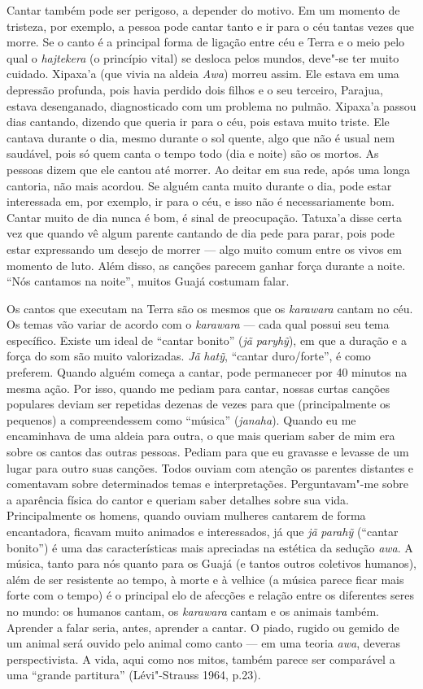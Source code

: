 Cantar também pode ser perigoso, a depender do motivo. Em um momento de
tristeza, por exemplo, a pessoa pode cantar tanto e ir para o céu tantas
vezes que morre. Se o canto é a principal forma de ligação entre céu e
Terra e o meio pelo qual o \emph{hajtekera} (o princípio vital) se
desloca pelos mundos, deve"-se ter muito cuidado. Xipaxa'a (que vivia na
aldeia \emph{Awa}) morreu assim. Ele estava em uma depressão profunda,
pois havia perdido dois filhos e o seu terceiro, Parajua, estava
desenganado, diagnosticado com um problema no pulmão. Xipaxa'a passou
dias cantando, dizendo que queria ir para o céu, pois estava muito
triste. Ele cantava durante o dia, mesmo durante o sol quente, algo que
não é usual nem saudável, pois só quem canta o tempo todo (dia e noite)
são os mortos. As pessoas dizem que ele cantou até morrer. Ao deitar em
sua rede, após uma longa cantoria, não mais acordou. Se alguém canta
muito durante o dia, pode estar interessada em, por exemplo, ir para o
céu, e isso não é necessariamente bom. Cantar muito de dia nunca é bom,
é sinal de preocupação. Tatuxa'a disse certa vez que quando vê algum
parente cantando de dia pede para parar, pois pode estar expressando um
desejo de morrer --- algo muito comum entre os vivos em momento de luto.
Além disso, as canções parecem ganhar força durante a noite. ``Nós
cantamos na noite'', muitos Guajá costumam falar.

Os cantos que executam na Terra são os mesmos que os \emph{karawara}
cantam no céu. Os temas vão variar de acordo com o \emph{karawara} ---
cada qual possui seu tema específico. Existe um ideal de ``cantar bonito''
(\emph{jã} \emph{paryhỹ}), em que a duração e a força do som são muito
valorizadas. \emph{Jã} \emph{hatỹ}, ``cantar duro/forte'', é como
preferem. Quando alguém começa a cantar, pode permanecer por 40 minutos
na mesma ação. Por isso, quando me pediam para cantar, nossas curtas
canções populares deviam ser repetidas dezenas de vezes para que
(principalmente os pequenos) a compreendessem como ``música''
(\emph{janaha}). Quando eu me encaminhava de uma aldeia para outra, o
que mais queriam saber de mim era sobre os cantos das outras pessoas.
Pediam para que eu gravasse e levasse de um lugar para outro suas
canções. Todos ouviam com atenção os parentes distantes e comentavam
sobre determinados temas e interpretações. Perguntavam"-me sobre a
aparência física do cantor e queriam saber detalhes sobre sua vida.
Principalmente os homens, quando ouviam mulheres cantarem de forma
encantadora, ficavam muito animados e interessados, já que \emph{jã}
\emph{parahỹ} (``cantar bonito'') é uma das características mais
apreciadas na estética da sedução \emph{awa}. A música, tanto para nós
quanto para os Guajá (e tantos outros coletivos humanos), além de ser
resistente ao tempo, à morte e à velhice (a música parece ficar mais
forte com o tempo) é o principal elo de afecções e relação entre os
diferentes seres no mundo: os humanos cantam, os \emph{karawara} cantam
e os animais também. Aprender a falar seria, antes, aprender a cantar. O
piado, rugido ou gemido de um animal será ouvido pelo animal como canto
--- em uma teoria \emph{awa}, deveras perspectivista. A vida, aqui como
nos mitos, também parece ser comparável a uma ``grande partitura''
(Lévi"-Strauss 1964, p.23).

